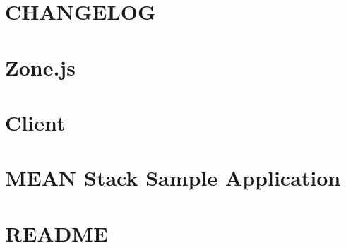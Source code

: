 \documentclass[twoside]{book}
\newcommand{\+}{\discretionary{\mbox{\scriptsize$\hookleftarrow$}}{}{}}
\begin{document}
\chapter{CHANGELOG}
\label{md__c___users_vaishnavi_jadhav__desktop__developer_code_mean_stack_example_client_node_modules_zone_js__c_h_a_n_g_e_l_o_g}

\chapter{Zone.\+js}
\label{md__c___users_vaishnavi_jadhav__desktop__developer_code_mean_stack_example_client_node_modules_zone_js__r_e_a_d_m_e}

\chapter{Client}
\label{md__c___users_vaishnavi_jadhav__desktop__developer_code_mean_stack_example_client__r_e_a_d_m_e}

\chapter{MEAN Stack Sample Application}
\label{md__c___users_vaishnavi_jadhav__desktop__developer_code_mean_stack_example__r_e_a_d_m_e}

\chapter{README}
\label{md__c___users_vaishnavi_jadhav__desktop__developer_code_mean_stack_example_server_node_modules__625f595439511f6708059c8c333b39a6}

\end{document}
